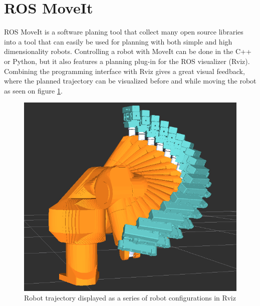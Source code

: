 \section{ROS MoveIt}
\label{sec:moveit}
ROS MoveIt is a software planing tool that collect many open source libraries into a tool that can easily be used for planning with both simple and high dimensionality robots.  Controlling a robot with MoveIt can be done in the C++ or Python, but it also features a planning plug-in for the ROS visualizer (Rviz). Combining the programming interface with Rviz gives a great visual feedback, where the planned trajectory can be visualized before and while moving the robot as seen on figure \ref{fig:robot_trajectory}.


\begin{figure}[htb]
	\begin{center}
		\includegraphics[scale=0.5,trim=0 0 0 0]{graphics/05_robotics/robot_trajectory.png}%
		\caption{Robot trajectory displayed as a series of robot configurations in Rviz}
		\label{fig:robot_trajectory}
	\end{center}
\end{figure}

